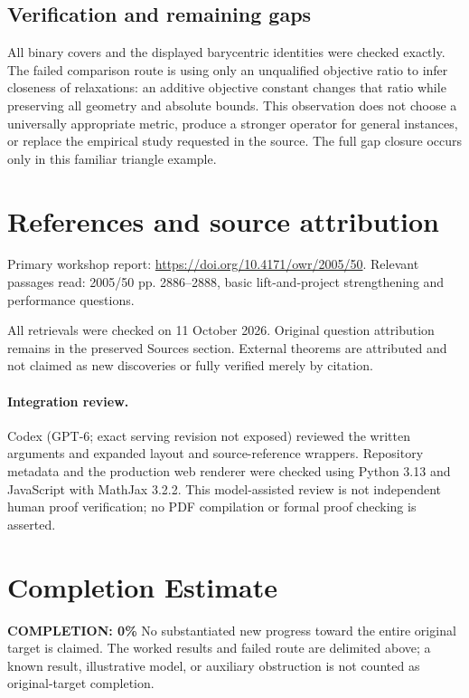 \documentclass[11pt]{article}
\begin{document}
\subsection{Verification and remaining gaps}
All binary covers and the displayed barycentric identities were checked exactly. The failed comparison route is using only an unqualified objective ratio to infer closeness of relaxations: an additive objective constant changes that ratio while preserving all geometry and absolute bounds. This observation does not choose a universally appropriate metric, produce a stronger operator for general instances, or replace the empirical study requested in the source. The full gap closure occurs only in this familiar triangle example.

\section{References and source attribution}
Primary workshop report: \url{https://doi.org/10.4171/owr/2005/50}. Relevant passages read: 2005/50 pp. 2886--2888, basic lift-and-project strengthening and performance questions.

All retrievals were checked on 11 October 2026. Original question attribution remains in the preserved Sources section. External theorems are attributed and not claimed as new discoveries or fully verified merely by citation.


\paragraph{Integration review.} Codex (GPT-6; exact serving revision not exposed) reviewed the written arguments and expanded layout and source-reference wrappers. Repository metadata and the production web renderer were checked using Python 3.13 and JavaScript with MathJax 3.2.2. This model-assisted review is not independent human proof verification; no PDF compilation or formal proof checking is asserted.

\section{Completion Estimate}
\noindent\textbf{COMPLETION: 0\%}
No substantiated new progress toward the entire original target is claimed. The worked results and failed route are delimited above; a known result, illustrative model, or auxiliary obstruction is not counted as original-target completion.
\end{document}

